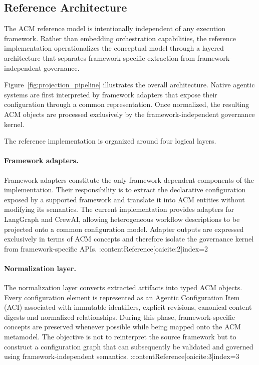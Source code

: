 \documentclass[10pt]{article}
\begin{document}
\subsection{Reference Architecture}
\label{sec:reference_architecture}

The ACM reference model is intentionally independent of any execution framework. Rather than embedding orchestration capabilities, the reference implementation operationalizes the conceptual model through a layered architecture that separates framework-specific extraction from framework-independent governance.

Figure~\ref{fig:projection_pipeline} illustrates the overall architecture. Native agentic systems are first interpreted by framework adapters that expose their configuration through a common representation. Once normalized, the resulting ACM objects are processed exclusively by the framework-independent governance kernel.

The reference implementation is organized around four logical layers.

\paragraph{Framework adapters.}

Framework adapters constitute the only framework-dependent components of the implementation. Their responsibility is to extract the declarative configuration exposed by a supported framework and translate it into ACM entities without modifying its semantics. The current implementation provides adapters for LangGraph and CrewAI, allowing heterogeneous workflow descriptions to be projected onto a common configuration model. Adapter outputs are expressed exclusively in terms of ACM concepts and therefore isolate the governance kernel from framework-specific APIs. :contentReference[oaicite:2]{index=2}

\paragraph{Normalization layer.}

The normalization layer converts extracted artifacts into typed ACM objects. Every configuration element is represented as an Agentic Configuration Item (ACI) associated with immutable identifiers, explicit revisions, canonical content digests and normalized relationships. During this phase, framework-specific concepts are preserved whenever possible while being mapped onto the ACM metamodel. The objective is not to reinterpret the source framework but to construct a configuration graph that can subsequently be validated and governed using framework-independent semantics. :contentReference[oaicite:3]{index=3}
\end{document}
